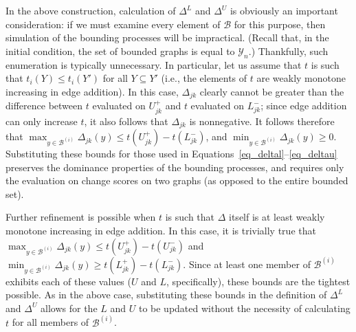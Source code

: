 \documentclass[11pt]{article}
\begin{document}
In the above construction, calculation of $\Delta^L$ and $\Delta^U$ is obviously an important consideration: if we must examine every element of $\mathcal{B}$ for this purpose, then simulation of the bounding processes will be impractical. (Recall that, in the initial condition, the set of bounded graphs is equal to $\mathcal{Y}_n$.)  Thankfully, such enumeration is typically unnecessary.  In particular, let us assume that $t$ is such that $t_i\left(Y\right)\le t_i\left(Y'\right)$ for all $Y \subseteq Y'$ (i.e., the elements of $t$ are weakly monotone increasing in edge addition).  In this case, $\Delta_{jk}$ clearly cannot be greater than the difference between $t$ evaluated on $U^+_{jk}$ and $t$ evaluated on $L^-_{jk}$; since edge addition can only increase $t$, it also follows that $\Delta_{jk}$ is nonnegative.  It follows therefore that $\max_{y \in \mathcal{B}^{(i)}} \Delta_{jk}(y) \le t\left(U^+_{jk}\right)-t\left(L^-_{jk}\right)$, and $\min_{y \in \mathcal{B}^{(i)}} \Delta_{jk}(y) \ge 0$.  Substituting these bounds for those used in Equations~\ref{eq_deltal}--\ref{eq_deltau} preserves the dominance properties of the bounding processes, and requires only the evaluation on change scores on two graphs (as opposed to the entire bounded set).

Further refinement is possible when $t$ is such that $\Delta$ itself is at least weakly monotone increasing in edge addition.  In this case, it is trivially true that $\max_{y \in \mathcal{B}^{(i)}} \Delta_{jk}(y) \le t\left(U^+_{jk}\right)-t\left(U^-_{jk}\right)$ and $\min_{y \in \mathcal{B}^{(i)}} \Delta_{jk}(y) \ge t\left(L^+_{jk}\right)-t\left(L^-_{jk}\right)$.  Since at least one member of $\mathcal{B}^{(i)}$ exhibits each of these values ($U$ and $L$, specifically), these bounds are the tightest possible.  As in the above case, substituting these bounds in the definition of $\Delta^L$ and $\Delta^U$ allows for the $L$ and $U$ to be updated without the necessity of calculating $t$ for all members of $\mathcal{B}^{(i)}$.
\end{document}
